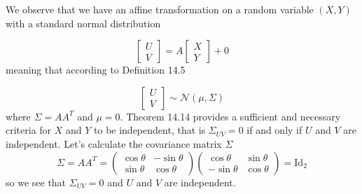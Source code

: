 
We observe that we have an affine transformation on a random variable $ (X,Y)$ with a standard
normal distribution

\[
    \begin{bmatrix}
    U \\
    V
    \end{bmatrix} = A \begin{bmatrix}
    X \\
    Y	
    \end{bmatrix} + 0
\] 
meaning that according to Definition 14.5 

\[
    \begin{bmatrix}
    U \\
    V
    \end{bmatrix} \sim \mathcal N(\mu, \Sigma)
\] 
where $ \Sigma = A A^{T} $ and $ \mu = 0$. Theorem 14.14 provides a sufficient and necessary
criteria for $ X$ and $ Y$ to be independent, that is $ \Sigma_{UV} = 0$ if and only if $U $ and $
V$ are independent. Let's calculate the covariance matrix $ \Sigma$
\[
    \Sigma = A A^{T} = \begin{pmatrix}
	\cos \theta & - \sin\theta \\
	\sin \theta & \cos \theta
    \end{pmatrix} \begin{pmatrix}
	\cos \theta & \sin \theta\\
	-\sin\theta & \cos \theta
    \end{pmatrix} = \mbox{Id}_{2} 
\] 
so we see that $ \Sigma_{UV} = 0$ and $ U$ and $ V$ are independent.

    
